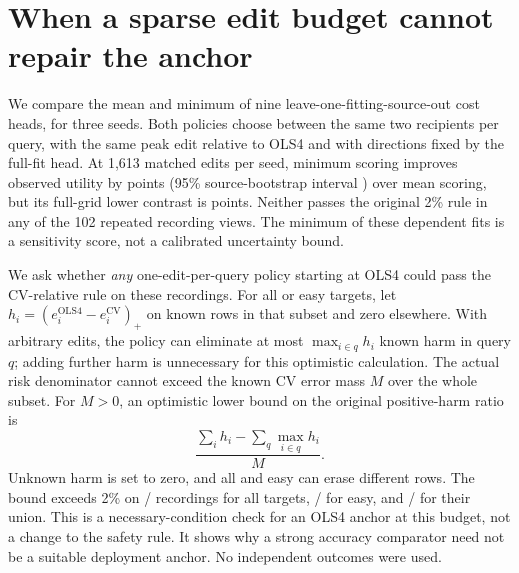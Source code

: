 \section{When a sparse edit budget cannot repair the anchor}
\label{supp:sparse-anchor-risk}
We compare the mean and minimum of nine leave-one-fitting-source-out cost
heads, for three seeds. Both policies choose between the same two recipients
per query, with the same peak edit relative to OLS4 and with directions fixed
by the full-fit head. At 1,613 matched edits per seed, minimum scoring improves
observed utility by \SparseKnown{} points (95\% source-bootstrap interval
\SparseKnownCI{}) over mean scoring, but its full-grid lower contrast is
\SparseLower{} points. Neither passes the original 2\% rule in any of the
102 repeated recording views. The minimum of these dependent fits is a
sensitivity score, not a calibrated uncertainty bound.

We ask whether \emph{any} one-edit-per-query policy starting at OLS4 could
pass the CV-relative rule on these recordings. For all or easy targets,
let $h_i=(e_i^{\mathrm{OLS4}}-e_i^{\mathrm{CV}})_+$ on known rows in that
subset and zero elsewhere. With arbitrary edits, the policy can eliminate
at most $\max_{i\in q} h_i$ known harm in query $q$; adding further harm is
unnecessary for this optimistic calculation. The actual risk denominator
cannot exceed the known CV error mass $M$ over the whole subset. For $M>0$,
an optimistic lower bound on the original positive-harm ratio is
\[
  \frac{\sum_i h_i-\sum_q\max_{i\in q} h_i}{M}.
\]
Unknown harm is set to zero, and all and easy can erase different rows. The
bound exceeds 2\% on \SparseAll{}/\SparseN{} recordings for all targets,
\SparseEasy{}/\SparseN{} for easy, and \SparseUnion{}/\SparseN{} for their
union. This is a necessary-condition check for an OLS4 anchor at this budget,
not a change to the safety rule. It shows why a strong accuracy comparator
need not be a suitable deployment anchor. No independent outcomes were used.
